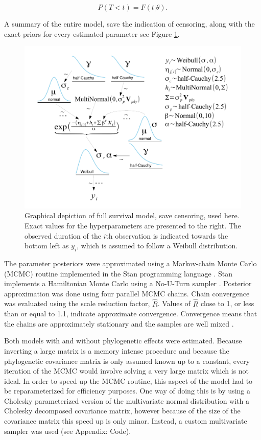 \documentclass[12pt,letterpaper]{article}
\begin{document}
\begin{equation}
  P(T < t) = F(t | \theta).
  \label{eq:left}
\end{equation}

A summary of the entire model, save the indication of censoring, along with the exact priors for every estimated parameter see Figure \ref{fig:model_diagram}.

\begin{figure}
  \centering
  \includegraphics[height = 0.5\textheight, width = \textwidth, keepaspectratio = true]{figure/mammal_survival_model}
  \caption{Graphical depiction of full survival model, save censoring, used here. Exact values for the hyperparameters are presented to the right. The observed duration of the \(i\)th observation is indicated towards the bottom left as \(y_{i}\), which is assumed to follow a Weibull distribution.}
  \label{fig:model_diagram}
\end{figure}


The parameter posteriors were approximated using a Markov-chain Monte Carlo (MCMC) routine implemented in the Stan programming language \citep{2014stan}. Stan implements a Hamiltonian Monte Carlo using a No-U-Turn sampler \citep{Hoffman-Gelman:2011}. Posterior approximation was done using four parallel MCMC chains. Chain convergence was evaluated using the scale reduction factor, \(\hat{R}\). Values of \(\hat{R}\) close to 1, or less than or equal to 1.1, indicate approximate convergence. Convergence means that the chains are approximately stationary and the samples are well mixed \citep{Gelman2013d}.

Both models with and without phylogenetic effects were estimated. Because inverting a large matrix is a memory intense procedure and because the phylogenetic covariance matrix is only assumed known up to a constant, every iteration of the MCMC would involve solving a very large matrix which is not ideal. In order to speed up the MCMC routine, this aspect of the model had to be reparameterized for efficiency purposes. One way of doing this is by using a Cholesky parameterized version of the multivariate normal distribution with a Cholesky decomposed covariance matrix, however because of the size of the covariance matrix this speed up is only minor. Instead, a custom multivariate sampler was used (see Appendix: Code).
\end{document}

